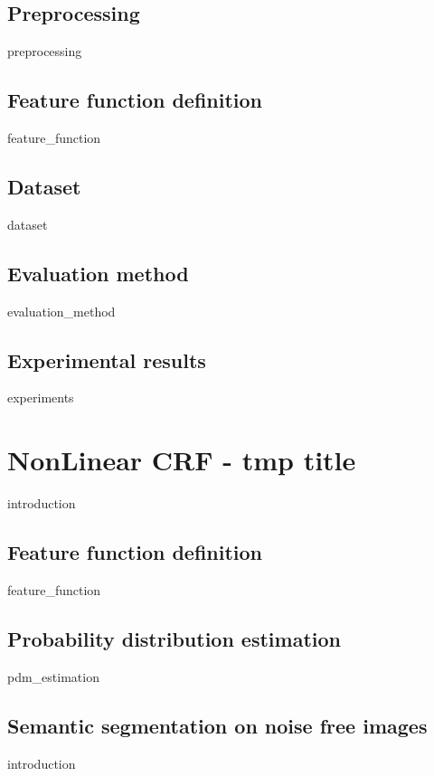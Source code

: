 \documentclass[12pt]{report}
\begin{document}
\section{Preprocessing}
\label{sec:linear_preprocessing}
{preprocessing}

\section{Feature function definition}	
{feature_function}

\section{Dataset}	
\label{sec:linear_dataset}
{dataset}

\section{Evaluation method}	
{evaluation_method}

\section{Experimental results}	
{experiments}




\chapter{NonLinear CRF - tmp title}
\label{chapter:nonlinear}
{introduction}

\section{Feature function definition}
{feature_function}

\section{Probability distribution estimation}
{pdm_estimation}

\section{Semantic segmentation on noise free images}
{introduction} 
\end{document}
